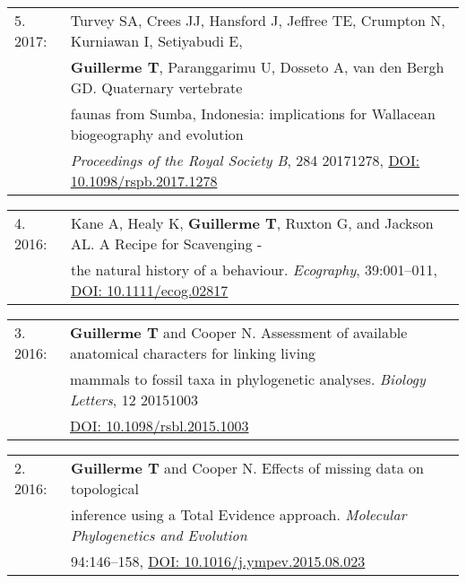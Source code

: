 \documentclass[10pt,a4paper]{article}
\begin{document}
{\bigskip

\begin{tabular}{ll}
5. 2017: & Turvey SA, Crees JJ, Hansford J, Jeffree TE, Crumpton N, Kurniawan I, Setiyabudi E,\\
      & \textbf{Guillerme T}, Paranggarimu U, Dosseto A, van den Bergh GD. Quaternary vertebrate\\
      & faunas from Sumba, Indonesia: implications for Wallacean biogeography and evolution \\
      & \textit{Proceedings of the Royal Society B}, 284 20171278, \href{http://rspb.royalsocietypublishing.org/content/284/1861/20171278}{DOI: 10.1098/rspb.2017.1278}\\ %
\end{tabular}

\bigskip

\begin{tabular}{ll}
4. 2016: & Kane A, Healy K, \textbf{Guillerme T}, Ruxton G, and Jackson AL. A Recipe for Scavenging -\\
      & the natural history of a behaviour. \textit{Ecography}, 39:001–011, \href{http://onlinelibrary.wiley.com/doi/10.1111/ecog.02817/abstract}{DOI: 10.1111/ecog.02817}\\ %
\end{tabular}

\bigskip

\begin{tabular}{ll}
3. 2016: &\textbf{Guillerme T} and Cooper N. Assessment of available anatomical characters for linking living\\
      & mammals to fossil taxa in phylogenetic analyses. \textit{Biology Letters}, 12 20151003\\
      & \href{http://rsbl.royalsocietypublishing.org/content/12/5/20151003}{DOI: 10.1098/rsbl.2015.1003}\\ %
\end{tabular}

\bigskip

\begin{tabular}{ll}
2. 2016: & \textbf{Guillerme T} and Cooper N. Effects of missing data on topological\\
      & inference using a Total Evidence approach. \textit{Molecular Phylogenetics and Evolution}\\
      & 94:146–158, \href{http://goo.gl/bVGrQJ}{DOI: 10.1016/j.ympev.2015.08.023}\\
\end{tabular}

}
\end{document}
